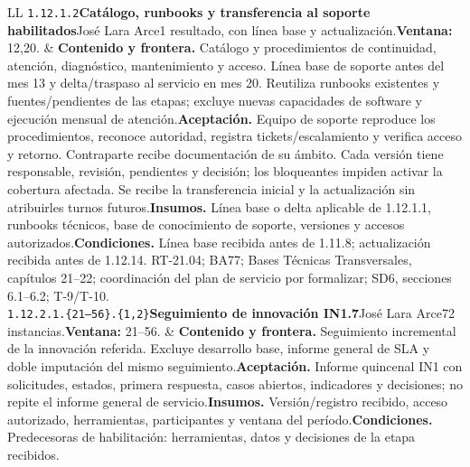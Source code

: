 \begin{longtable}{L{\tabcolsep\relax}L{\tabcolsep\relax}}
\texttt{1.\allowbreak{}12.\allowbreak{}1.\allowbreak{}2}\newline{}\textbf{Catálogo, runbooks y transferencia al soporte habilitados}\newline{}José Lara Arce\newline{}1 resultado, con línea base y actualización.\newline{}\textbf{Ventana:} 12,20. & \textbf{Contenido y frontera.} Catálogo y procedimientos de continuidad, atención, diagnóstico, mantenimiento y acceso. Línea base de soporte antes del mes 13 y delta/traspaso al servicio en mes 20. Reutiliza runbooks existentes y fuentes/pendientes de las etapas; excluye nuevas capacidades de software y ejecución mensual de atención.\newline{}\textbf{Aceptación.} Equipo de soporte reproduce los procedimientos, reconoce autoridad, registra tickets/escalamiento y verifica acceso y retorno. Contraparte recibe documentación de su ámbito. Cada versión tiene responsable, revisión, pendientes y decisión; los bloqueantes impiden activar la cobertura afectada. Se recibe la transferencia inicial y la actualización sin atribuirles turnos futuros.\newline{}\textbf{Insumos.} Línea base o delta aplicable de 1.12.1.1, runbooks técnicos, base de conocimiento de soporte, versiones y accesos autorizados.\newline{}\textbf{Condiciones.} Línea base recibida antes de 1.11.8; actualización recibida antes de 1.12.14. RT-21.04; BA77; Bases Técnicas Transversales, capítulos 21--22; coordinación del plan de servicio por formalizar; SD6, secciones 6.1--6.2; T-9/T-10.\\\hline
\texttt{1.\allowbreak{}12.\allowbreak{}2.\allowbreak{}1.\allowbreak{}\{21--56\}.\allowbreak{}\{1,\allowbreak{}2\}}\newline{}\textbf{Seguimiento de innovación IN1.7}\newline{}José Lara Arce\newline{}72 instancias.\newline{}\textbf{Ventana:} 21--56. & \textbf{Contenido y frontera.} Seguimiento incremental de la innovación referida. Excluye desarrollo base, informe general de SLA y doble imputación del mismo seguimiento.\newline{}\textbf{Aceptación.} Informe quincenal IN1 con solicitudes, estados, primera respuesta, casos abiertos, indicadores y decisiones; no repite el informe general de servicio.\newline{}\textbf{Insumos.} Versión/registro recibido, acceso autorizado, herramientas, participantes y ventana del período.\newline{}\textbf{Condiciones.} Predecesoras de habilitación: herramientas, datos y decisiones de la etapa recibidos.\\\hline

\end{longtable}
